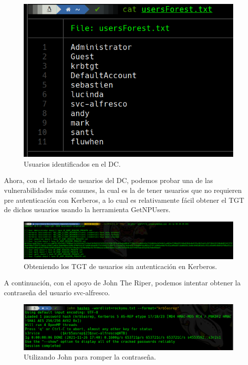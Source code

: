 \documentclass{article}
\begin{document}
\begin{figure}[H]
	\center
	\includegraphics[width=\textwidth/2]{images/forest/archivo_userForest.txt.png}
	\caption{Usuarios identificados en el DC.}
\end{figure}

Ahora, con el listado de usuarios del DC, podemos probar una de las vulnerabilidades más comunes, la cual es la de tener usuarios que no requieren pre autenticación con Kerberos, a lo cual es relativamente fácil obtener el TGT de dichos usuarios usando la herramienta GetNPUsers.

\begin{figure}[H]
	\center
	\includegraphics[width=\textwidth]{images/forest/ticket-NPUsers-.png}
	\caption{Obteniendo los TGT de usuarios sin autenticación en Kerberos.}
\end{figure}

A continuación, con el apoyo de John The Riper, podemos intentar obtener la contraseña del usuario svc-alfresco.

\begin{figure}[H]
	\center
	\includegraphics[width=\textwidth]{images/forest/crackeado.png}
	\caption{Utilizando John para romper la contraseña.}
\end{figure}
\end{document}
